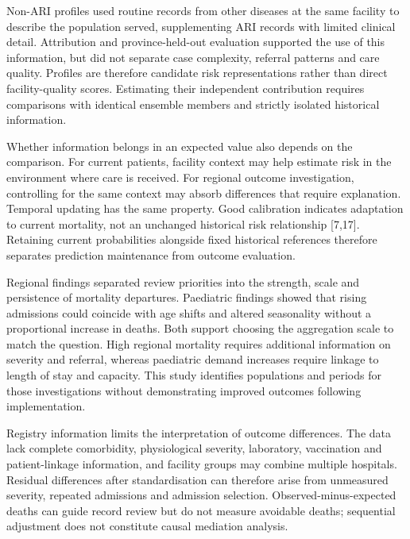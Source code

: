 \documentclass[11pt,a4paper]{article}
\newcommand{\subheading}[1]{\par\needspace{3\baselineskip}\vspace{5pt}{\bfseries #1}\par\vspace{1pt}}
\begin{document}
\subheading{6.2 Facility profiles and fixed references serve different purposes}
Non-ARI profiles used routine records from other diseases at the same facility to describe the population served, supplementing ARI records with limited clinical detail. Attribution and province-held-out evaluation supported the use of this information, but did not separate case complexity, referral patterns and care quality. Profiles are therefore candidate risk representations rather than direct facility-quality scores. Estimating their independent contribution requires comparisons with identical ensemble members and strictly isolated historical information.

Whether information belongs in an expected value also depends on the comparison. For current patients, facility context may help estimate risk in the environment where care is received. For regional outcome investigation, controlling for the same context may absorb differences that require explanation. Temporal updating has the same property. Good calibration indicates adaptation to current mortality, not an unchanged historical risk relationship [7,17]. Retaining current probabilities alongside fixed historical references therefore separates prediction maintenance from outcome evaluation.

\subheading{6.3 From monitoring signals to further investigation}
Regional findings separated review priorities into the strength, scale and persistence of mortality departures. Paediatric findings showed that rising admissions could coincide with age shifts and altered seasonality without a proportional increase in deaths. Both support choosing the aggregation scale to match the question. High regional mortality requires additional information on severity and referral, whereas paediatric demand increases require linkage to length of stay and capacity. This study identifies populations and periods for those investigations without demonstrating improved outcomes following implementation.

\clearpage
\subheading{6.4 Scope of inference and next-stage validation}
Registry information limits the interpretation of outcome differences. The data lack complete comorbidity, physiological severity, laboratory, vaccination and patient-linkage information, and facility groups may combine multiple hospitals. Residual differences after standardisation can therefore arise from unmeasured severity, repeated admissions and admission selection. Observed-minus-expected deaths can guide record review but do not measure avoidable deaths; sequential adjustment does not constitute causal mediation analysis.
\end{document}
